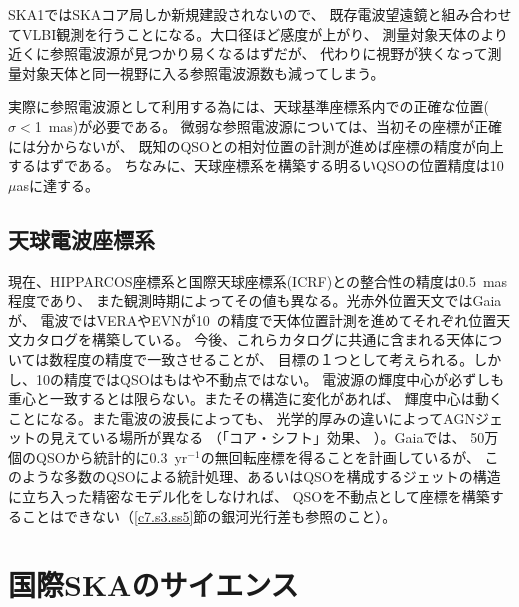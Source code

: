 SKA1ではSKAコア局しか新規建設されないので、
既存電波望遠鏡と組み合わせてVLBI観測を行うことになる。大口径ほど感度が上がり、
測量対象天体のより近くに参照電波源が見つかり易くなるはずだが、
代わりに視野が狭くなって測量対象天体と同一視野に入る参照電波源数も減ってしまう。

実際に参照電波源として利用する為には、天球基準座標系内での正確な位置($\sigma<$1~mas)が必要である。
微弱な参照電波源については、当初その座標が正確には分からないが、
既知のQSOとの相対位置の計測が進めば座標の精度が向上するはずである。
ちなみに、天球座標系を構築する明るいQSOの位置精度は10~$\mu$asに達する。

\setcounter{subsection}{5}\subsection{天球電波座標系}\label{c7.s2.ss6}

現在、HIPPARCOS座標系と国際天球座標系(ICRF)との整合性の精度は0.5~mas程度\citep{1998A&A...331L..33F}であり、
また観測時期によってその値も異なる。光赤外位置天文ではGaiaが、
電波ではVERAやEVNが10~\uas の精度で天体位置計測を進めてそれぞれ位置天文カタログを構築している。
今後、これらカタログに共通に含まれる天体については数\uas 程度の精度で一致させることが、
目標の１つとして考えられる。しかし、10\uas の精度ではQSOはもはや不動点ではない。
電波源の輝度中心が必ずしも重心と一致するとは限らない。またその構造に変化があれば、
輝度中心は動くことになる\citep{2008IAUS..248..324B}。また電波の波長によっても、
光学的厚みの違いによってAGNジェットの見えている場所が異なる
（「コア・シフト」効果、 \citealt{2011Nature...477...185H}）。Gaiaでは、
50万個のQSOから統計的に0.3\uas ~yr$^{-1}$の無回転座標を得ることを計画しているが、
このような多数のQSOによる統計処理、あるいはQSOを構成するジェットの構造に立ち入った精密なモデル化をしなければ、
QSOを不動点として座標を構築することはできない（\ref{c7.s3.ss5}節の銀河光行差も参照のこと）。

\setcounter{section}{2}\section{国際SKAのサイエンス}\label{c7.s3}

